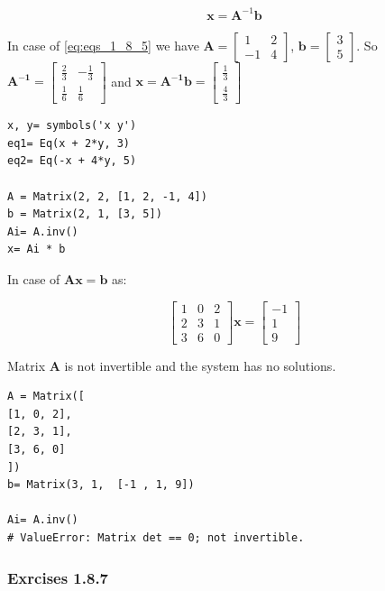 \begin{equation}
\mathbf{x} = \mathbf{A}^{-1}\mathbf{b}
\end{equation}

In case of \ref{eq:eqs_1_8_5} we have $\mathbf{A} = \left[\begin{matrix}1 & 2\\-1 & 4\end{matrix}\right]$,
$\mathbf{b} = \left[\begin{matrix}3\\5\end{matrix}\right]$. So
$\mathbf{A^{-1}} = \left[\begin{matrix}\frac{2}{3} & - \frac{1}{3}\\\frac{1}{6} & \frac{1}{6}\end{matrix}\right]$
and $\mathbf{x} = \mathbf{A^{-1}b} = \left[\begin{matrix}\frac{1}{3}\\\frac{4}{3}\end{matrix}\right]$

\begin{verbatim}
x, y= symbols('x y')
eq1= Eq(x + 2*y, 3)
eq2= Eq(-x + 4*y, 5)

A = Matrix(2, 2, [1, 2, -1, 4])
b = Matrix(2, 1, [3, 5])
Ai= A.inv()
x= Ai * b
\end{verbatim}

In case of $\mathbf{Ax = b}$ as:

\begin{equation}
\left[\begin{matrix}1 & 0 & 2\\2 & 3 & 1\\3 & 6 & 0\end{matrix}\right]
\mathbf{x} = 
\left[\begin{matrix}-1\\1\\9\end{matrix}\right]
\end{equation}

Matrix \textbf{A} is not invertible and the system has no solutions.

\begin{verbatim}
A = Matrix([
[1, 0, 2],
[2, 3, 1],
[3, 6, 0]
])
b= Matrix(3, 1,  [-1 , 1, 9])

Ai= A.inv()
# ValueError: Matrix det == 0; not invertible.
\end{verbatim}

\subsubsection{Exrcises 1.8.7}

